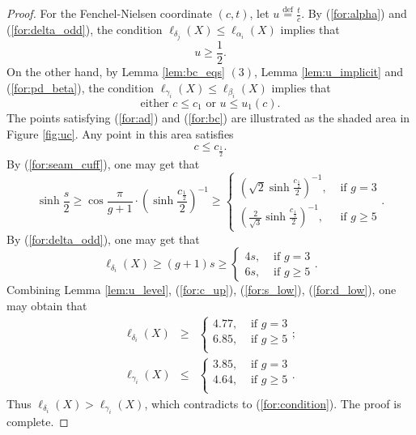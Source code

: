 \documentclass[UTF8]{amsart}
\numberwithin{equation}{section}
\theoremstyle{definition}
\theoremstyle{example}
\theoremstyle{remark}
\begin{document}
\begin{proof}
 For the Fenchel-Nielsen coordinate $(c,t)$, let $u \overset{\mathrm{def}}{=} \frac{t}{c}$. By (\ref{for:alpha}) and (\ref{for:delta_odd}), the condition $\ell_{\delta_j}(X)  \le \ell_{\alpha_i}(X)$ implies that
 \begin{equation}
  u \ge \frac{1}{2}. 
  \label{for:ad}
 \end{equation}
 On the other hand, by Lemma \ref{lem:bc_eqs} $(3)$, Lemma \ref{lem:u_implicit} and (\ref{for:pd_beta}), the condition $\ell_{\gamma_i}(X)  \le \ell_{\beta_i}(X)$ implies that
 \begin{equation}
  \text{either } c \le c_1 \text{ or }u \le u_1(c). 
  \label{for:bc}
 \end{equation}
 The points satisfying (\ref{for:ad}) and (\ref{for:bc}) are illustrated as the shaded area in Figure \ref{fig:uc}. Any point in this area satisfies 
 \begin{equation}
  c \le c_{ \frac{1}{2}}. 
  \label{for:c_up}
 \end{equation}
 By (\ref{for:seam_cuff}), one may get that
 \begin{equation}
  \sinh \frac{s}{2} \ge  {\cos\frac{\pi}{g+1}}\cdot \left( {\sinh \frac{c_{ \frac{1}{2}}}{2}} \right)^{-1}  \ge \begin{cases}
   \left({\sqrt{2}\sinh \frac{c_{ \frac{1}{2}}}{2}}  \right)^{-1}  , &\text{ if } g = 3 \\
   \left( {\frac{2}{\sqrt{3}}\sinh \frac{c_{ \frac{1}{2}}}{2}} \right)^{-1}  , &\text{ if } g  \ge 5
  \end{cases}. 
  \label{for:s_low}
 \end{equation}
 By (\ref{for:delta_odd}), one may get that
 \begin{equation}
  \ell_{\delta_i}(X) \ge (g+1)s \ge \begin{cases}
   4s, &\text{ if }g=3\\
   6s, & \text{ if }g \ge 5
  \end{cases}. 
  \label{for:d_low}
 \end{equation}
 Combining Lemma \ref{lem:u_level}, (\ref{for:c_up}), (\ref{for:s_low}), (\ref{for:d_low}), one may obtain that
 \begin{eqnarray*}
  \ell_{\delta_i}(X)&\ge& \begin{cases}
   4.77, &\text{ if }g = 3 \\
   6.85, &\text{ if }g \ge 5 \\
  \end{cases}; \\
  \ell_{\gamma_i}(X)&\le& \begin{cases}
   3.85, &\text{ if }g = 3 \\
   4.64, &\text{ if }g \ge 5 \\
  \end{cases}. 
 \end{eqnarray*}
 Thus $\ell_{\delta_i}(X) > \ell_{\gamma_i}(X)$, which contradicts to (\ref{for:condition}). The proof is complete. 
\end{proof}
\end{document}

